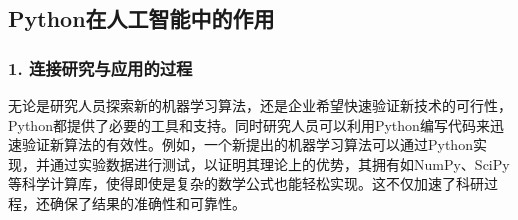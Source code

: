 




\subsection{Python在人工智能中的作用}

\subsubsection{1. 连接研究与应用的过程}

无论是研究人员探索新的机器学习算法，还是企业希望快速验证新技术的可行性，Python都提供了必要的工具和支持。同时研究人员可以利用Python编写代码来迅速验证新算法的有效性。例如，一个新提出的机器学习算法可以通过Python实现，并通过实验数据进行测试，以证明其理论上的优势，其拥有如NumPy、SciPy等科学计算库，使得即使是复杂的数学公式也能轻松实现。这不仅加速了科研过程，还确保了结果的准确性和可靠性。

